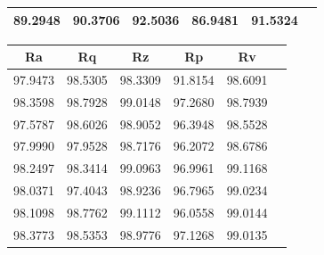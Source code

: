 \documentclass[suppldata]{interact}
\begin{document}
\begin {landscape}
\begin{minipage}{0.30\textwidth}
\begin{tabular}{|l|l|l|l|l|l|}
        89.2948 & 90.3706 & 92.5036 & 86.9481 & 91.5324 \\ \hline
    \end{tabular}
        \label{tab:rpmapete}
    \end{minipage}
    \hfill 
    \begin{minipage}{0.40\textwidth}
    \small
    \begin{tabular}{|c|c|c|c|c|c|}
    \hline
          Ra &  Rq &  Rz &  Rp & Rv \\ \hline
        97.9473 & 98.5305 & 98.3309 & 91.8154 & 98.6091 \\ \hline
        98.3598 & 98.7928 & 99.0148 & 97.2680 & 98.7939 \\ \hline
        97.5787 & 98.6026 & 98.9052 & 96.3948 & 98.5528 \\ \hline
        97.9990 & 97.9528 & 98.7176 & 96.2072 & 98.6786 \\ \hline
        98.2497 & 98.3414 & 99.0963 & 96.9961 & 99.1168 \\ \hline
        98.0371 & 97.4043 & 98.9236 & 96.7965 & 99.0234 \\ \hline
        98.1098 & 98.7762 & 99.1112 & 96.0558 & 99.0144 \\ \hline
        98.3773 & 98.5353 & 98.9776 & 97.1268 & 99.0135 \\ \hline
     \end{tabular}
     \label{tab:rpr2te}
     \end{minipage}
    \end{landscape}
 
\end{document}
